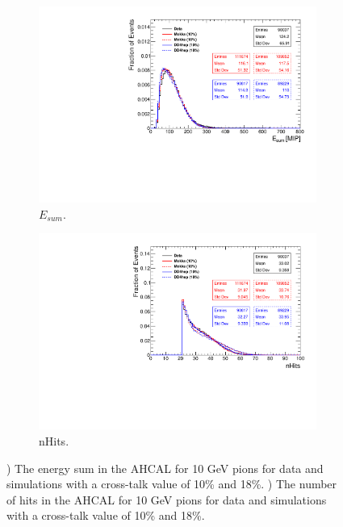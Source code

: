 \begin{figure}[htbp!]
  \centering
  \begin{subfigure}[t]{0.49\textwidth}
    \includegraphics[width=1.\linewidth]{../Thesis_Plots/Timing/Pions/Plots/Comparison_EnergySum_Xtalk_pions10GeV.pdf}
    \caption{$E_{sum}$.} \label{fig:pi10Evis}
  \end{subfigure}
  \hfill
  \begin{subfigure}[t]{0.49\textwidth}
    \includegraphics[width=1.\linewidth]{../Thesis_Plots/Timing/Pions/Plots/Comparison_nHits_Xtalk_pions10GeV.pdf}
    \caption{nHits.} \label{fig:pi10nHits}
  \end{subfigure}
  \caption{) The energy sum in the AHCAL for 10 GeV pions for data and simulations with a cross-talk value of 10\% and 18\%. ) The number of hits in the AHCAL for 10 GeV pions for data and simulations with a cross-talk value of 10\% and 18\%.}
  \label{fig:pi10Val}
\end{figure}

